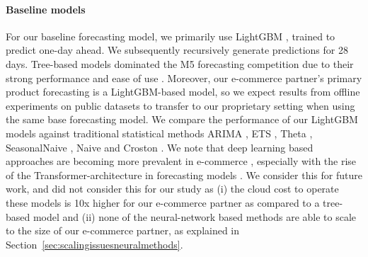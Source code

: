 \documentclass[preprint, 3p, times, twocolumn]{elsarticle}
\begin{document}
  \paragraph{Baseline models} For our baseline forecasting model, we primarily use LightGBM \cite{ke_lightgbm_2017}, trained to predict one-day ahead. We subsequently recursively generate predictions for 28 days. Tree-based models dominated the M5 forecasting competition due to their strong performance and ease of use \cite{makridakis_m5_2022,januschowski_forecasting_2022}. Moreover, our e-commerce partner's primary product forecasting is a LightGBM-based model, so we expect results from offline experiments on public datasets to transfer to our proprietary setting when using the same base forecasting model. We compare the performance of our LightGBM models against traditional statistical methods ARIMA \cite{box_distribution_1970}, ETS \cite{hyndman_forecasting_2008}, Theta \cite{assimakopoulos_theta_2000}, SeasonalNaive \cite{hyndman_forecasting_2021}, Naive \cite{hyndman_forecasting_2021} and Croston \cite{croston_forecasting_1972}. 
  We note that deep learning based approaches are becoming more prevalent in e-commerce \cite{kunz_deep_2023}, especially with the rise of the Transformer-architecture in forecasting models \cite{lim_temporal_2021,li_enhancing_2019}. We consider this for future work, and did not consider this for our study as (i) the cloud cost to operate these models is 10x higher for our e-commerce partner as compared to a tree-based model and (ii) none of the neural-network based methods are able to scale to the size of our e-commerce partner, as explained in Section~\ref{sec:scalingissuesneuralmethods}. 
\end{document}

